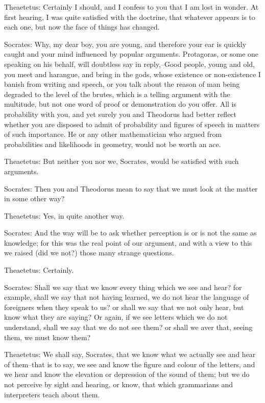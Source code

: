 Theaetetus: Certainly I should, and I confess to you that I am lost in
wonder. At first hearing, I was quite satisfied with the doctrine, that
whatever appears is to each one, but now the face of things has changed.

Socrates: Why, my dear boy, you are young, and therefore your ear
is quickly caught and your mind influenced by popular arguments.
Protagoras, or some one speaking on his behalf, will doubtless say in
reply,--Good people, young and old, you meet and harangue, and bring
in the gods, whose existence or non-existence I banish from writing and
speech, or you talk about the reason of man being degraded to the level
of the brutes, which is a telling argument with the multitude, but not
one word of proof or demonstration do you offer. All is probability with
you, and yet surely you and Theodorus had better reflect whether you
are disposed to admit of probability and figures of speech in matters
of such importance. He or any other mathematician who argued from
probabilities and likelihoods in geometry, would not be worth an ace.

Theaetetus: But neither you nor we, Socrates, would be satisfied with
such arguments.

Socrates: Then you and Theodorus mean to say that we must look at the
matter in some other way?

Theaetetus: Yes, in quite another way.

Socrates: And the way will be to ask whether perception is or is not the
same as knowledge; for this was the real point of our argument, and with
a view to this we raised (did we not?) those many strange questions.

Theaetetus: Certainly.

Socrates: Shall we say that we know every thing which we see and hear?
for example, shall we say that not having learned, we do not hear the
language of foreigners when they speak to us? or shall we say that
we not only hear, but know what they are saying? Or again, if we see
letters which we do not understand, shall we say that we do not see
them? or shall we aver that, seeing them, we must know them?

Theaetetus: We shall say, Socrates, that we know what we actually see
and hear of them--that is to say, we see and know the figure and colour
of the letters, and we hear and know the elevation or depression of the
sound of them; but we do not perceive by sight and hearing, or know,
that which grammarians and interpreters teach about them.

